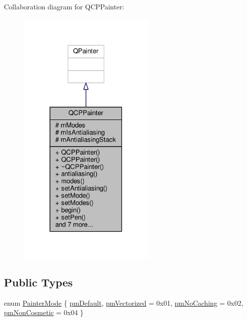 Collaboration diagram for Q\+C\+P\+Painter\+:\nopagebreak
\begin{figure}[H]
\begin{center}
\leavevmode
\includegraphics[width=189pt]{class_q_c_p_painter__coll__graph}
\end{center}
\end{figure}
\subsection*{Public Types}
\begin{DoxyCompactItemize}
\item 
enum \hyperlink{class_q_c_p_painter_a156cf16444ff5e0d81a73c615fdb156d}{Painter\+Mode} \{ \hyperlink{class_q_c_p_painter_a156cf16444ff5e0d81a73c615fdb156da3bac5e87e3d58553b297befb4eee2a45}{pm\+Default}, 
\hyperlink{class_q_c_p_painter_a156cf16444ff5e0d81a73c615fdb156daeda679cd55dcd468341d07d48a30b6ab}{pm\+Vectorized} = 0x01, 
\hyperlink{class_q_c_p_painter_a156cf16444ff5e0d81a73c615fdb156dae78f9a4eb277a5f9207f50850a51a0b0}{pm\+No\+Caching} = 0x02, 
\hyperlink{class_q_c_p_painter_a156cf16444ff5e0d81a73c615fdb156dac1e481bfaf408f2bd2eaad3ec341f36b}{pm\+Non\+Cosmetic} = 0x04
 \}
\end{DoxyCompactItemize}
